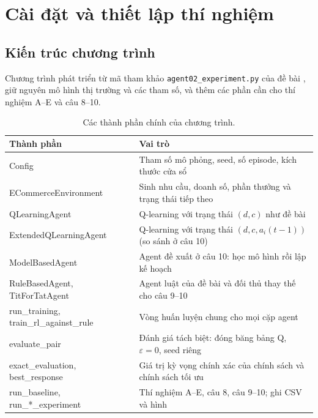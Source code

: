 \documentclass[12pt,a4paper]{report}
\begin{document}
\chapter{Cài đặt và thiết lập thí nghiệm}
\label{chap:setup}

\section{Kiến trúc chương trình}
Chương trình phát triển từ mã tham khảo \texttt{agent02\_experiment.py} của đề bài
\cite{complementary}, giữ nguyên mô hình thị trường và các tham số, và thêm các phần
cần cho thí nghiệm A--E và câu 8--10.

\begin{table}[H]
\centering
\small
\caption{Các thành phần chính của chương trình.}
\begin{tabularx}{\textwidth}{>{\ttfamily}p{5.2cm}X}
\toprule
\normalfont\bfseries Thành phần & \bfseries Vai trò \\
\midrule
Config & Tham số mô phỏng, seed, số episode, kích thước cửa sổ \\
ECommerceEnvironment & Sinh nhu cầu, doanh số, phần thưởng và trạng thái tiếp theo \\
QLearningAgent & Q-learning với trạng thái $(d,c)$ như đề bài \\
ExtendedQLearningAgent & Q-learning với trạng thái $(d,c,a_i(t-1))$ (so sánh ở câu 10) \\
ModelBasedAgent & Agent đề xuất ở câu 10: học mô hình rồi lập kế hoạch \\
RuleBasedAgent, TitForTatAgent & Agent luật của đề bài và đối thủ thay thế cho câu 9--10 \\
run\_training, train\_rl\_against\_rule & Vòng huấn luyện chung cho mọi cặp agent \\
evaluate\_pair & Đánh giá tách biệt: đóng băng bảng Q, $\varepsilon=0$, seed riêng \\
exact\_evaluation, best\_response & Giá trị kỳ vọng chính xác của chính sách và chính sách tối ưu \\
run\_baseline, run\_*\_experiment & Thí nghiệm A--E, câu 8, câu 9--10; ghi CSV và hình \\
\bottomrule
\end{tabularx}
\end{table}
\end{document}
